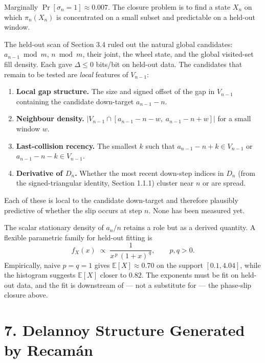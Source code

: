 \documentclass[
  11pt,
]{article}
\providecommand{\tightlist}{%
  \setlength{\itemsep}{0pt}\setlength{\parskip}{0pt}}
\begin{document}
Marginally \(\Pr[\sigma_n = 1] \approx 0.007\). The closure problem is
to find a state \(X_n\) on which \(\pi_n(X_n)\) is concentrated on a
small subset and predictable on a held-out window.

The held-out scan of Section 3.4 ruled out the natural global
candidates: \(a_{n-1} \bmod m\), \(n \bmod m\), their joint, the wheel
state, and the global visited-set fill density. Each gave
\(\Delta \le 0\) bits/bit on held-out data. The candidates that remain
to be tested are \emph{local} features of \(V_{n-1}\):

\begin{enumerate}
\def\labelenumi{\arabic{enumi}.}
\tightlist
\item
  \textbf{Local gap structure.} The size and signed offset of the gap in
  \(V_{n-1}\) containing the candidate down-target \(a_{n-1} - n\).
\item
  \textbf{Neighbour density.}
  \(|V_{n-1} \cap [a_{n-1} - n - w,\; a_{n-1} - n + w]|\) for a small
  window \(w\).
\item
  \textbf{Last-collision recency.} The smallest \(k\) such that
  \(a_{n-1} - n + k \in V_{n-1}\) or \(a_{n-1} - n - k \in V_{n-1}\).
\item
  \textbf{Derivative of \(D_n\).} Whether the most recent down-step
  indices in \(D_n\) (from the signed-triangular identity, Section
  1.1.1) cluster near \(n\) or are spread.
\end{enumerate}

Each of these is local to the candidate down-target and therefore
plausibly predictive of whether the slip occurs at step \(n\). None has
been measured yet.

The scalar stationary density of \(a_n/n\) retains a role but as a
derived quantity. A flexible parametric family for held-out fitting is
\[
f_X(x) \;\propto\; \frac{1}{x^{\,p}\,(1 + x)^{\,q}}, \qquad p, q > 0.
\] Empirically, naive \(p = q = 1\) gives \(\mathbb{E}[X] \approx 0.70\)
on the support \([0.1, 4.04]\), while the histogram suggests
\(\mathbb{E}[X]\) closer to \(0.82\). The exponents must be fit on
held-out data, and the fit is downstream of --- not a substitute for ---
the phase-slip closure above.

\hypertarget{delannoy-structure-generated-by-recamuxe1n}{%
\section{7. Delannoy Structure Generated by
Recamán}\label{delannoy-structure-generated-by-recamuxe1n}}
\end{document}
